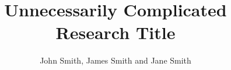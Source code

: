 \documentclass[final]{beamer}
\title{Unnecessarily Complicated Research Title} %
\author{John Smith, James Smith and Jane Smith} %
\institute{Department and University Name} %
\newlength{\sepwid}
\newlength{\onecolwid}
\begin{document}

\setlength{\belowcaptionskip}{2ex} %
\setlength\belowdisplayshortskip{2ex} %

\begin{frame}[t] %

\begin{columns}[t] %

\begin{column}{\sepwid}\end{column} %








\end{columns}
\end{frame}
\end{document}

